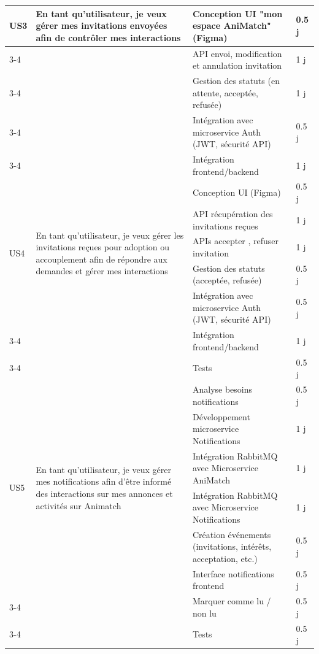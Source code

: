 \begin{longtable}{|p{2cm}|p{5cm}|p{6cm}|p{2cm}|}
\multirow{8}{2cm}{US3}
& \multirow{8}{5cm}{En tant qu’utilisateur, je veux gérer mes invitations envoyées afin de contrôler mes interactions}
& Conception UI "mon espace AniMatch"  (Figma) & 0.5 j \\
\cline{3-4}
& & API envoi, modification et annulation invitation & 1 j \\
\cline{3-4}
& & Gestion des statuts (en attente, acceptée, refusée) & 1 j \\ 
\cline{3-4} 
& & Intégration avec microservice Auth (JWT, sécurité API) & 0.5 j \\
\cline{3-4}
& & Intégration frontend/backend & 1 j \\
\hline

\multirow{5}{2cm}{US4}
& \multirow{5}{5cm}{En tant qu’utilisateur, je veux gérer les invitations reçues pour adoption ou accouplement afin de répondre aux demandes et gérer mes interactions}
& Conception UI (Figma) & 0.5 j \\
\cline{3-4}
& & API récupération des invitations reçues & 1 j \\
\cline{3-4}
& & APIs accepter , refuser invitation & 1 j \\
\cline{3-4}
& &  Gestion des statuts (acceptée, refusée)  & 0.5 j \\
\cline{3-4}
& & Intégration avec microservice Auth (JWT, sécurité API) & 0.5 j \\ 
\cline{3-4} 
& & Intégration frontend/backend & 1 j \\ 
\cline{3-4}  
\cline{3-4}
& & Tests & 0.5 j \\
\hline

\multirow{6}{2cm}{US5}
& \multirow{6}{5cm}{En tant qu’utilisateur, je veux gérer mes notifications afin d’être informé des interactions sur mes annonces et activités sur Animatch}
& Analyse besoins notifications & 0.5 j \\
\cline{3-4}
& & Développement microservice Notifications & 1 j \\
\cline{3-4}
& & Intégration RabbitMQ avec Microservice AniMatch & 1 j \\
\cline{3-4}
& & Intégration RabbitMQ avec Microservice Notifications & 1 j \\
\cline{3-4}
& & Création événements (invitations, intérêts, acceptation, etc.) & 0.5 j \\
\cline{3-4}
& & Interface notifications frontend & 0.5 j \\
\cline{3-4}
& & Marquer comme lu / non lu & 0.5 j \\ 
\cline{3-4}
& & Tests & 0.5 j \\
\hline


\end{longtable}
